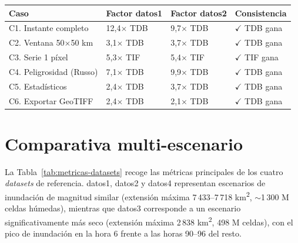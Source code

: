 \begin{center}
\begin{tabularx}{\textwidth}{p{5cm}XXX}
\toprule
\textbf{Caso} & \textbf{Factor datos1} & \textbf{Factor datos2} & \textbf{Consistencia} \\
\midrule
C1. Instante completo & 12,4$\times$ TDB & 9,7$\times$ TDB & $\checkmark$ TDB gana \\
C2. Ventana 50$\times$50 km & 3,1$\times$ TDB & 3,7$\times$ TDB & $\checkmark$ TDB gana \\
C3. Serie 1 píxel & 5,3$\times$ TIF & 5,4$\times$ TIF & $\checkmark$ TIF gana \\
C4. Peligrosidad (Russo) & 7,1$\times$ TDB & 9,9$\times$ TDB & $\checkmark$ TDB gana \\
C5. Estadísticos & 2,4$\times$ TDB & 3,7$\times$ TDB & $\checkmark$ TDB gana \\
C6. Exportar GeoTIFF & 2,4$\times$ TDB & 2,1$\times$ TDB & $\checkmark$ TDB gana \\
\bottomrule
\end{tabularx}
\captionsetup{hypcap=false}
\label{tab:comparativa-datos1-datos2}
\end{center}

\section{Comparativa multi-escenario}\label{comparativa-multiescenario}

La Tabla~\ref{tab:metricas-datasets} recoge las métricas principales de los cuatro \textit{datasets} de referencia. datos1, datos2 y datos4 representan escenarios de inundación de magnitud similar (extensión máxima 7\,433--7\,718 km\textsuperscript{2}, $\sim$1\,300 M celdas húmedas), mientras que datos3 corresponde a un escenario significativamente más seco (extensión máxima 2\,838 km\textsuperscript{2}, 498 M celdas), con el pico de inundación en la hora 6 frente a las horas 90--96 del resto.

